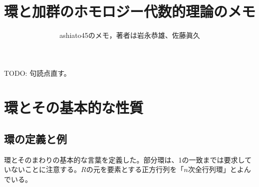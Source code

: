 \documentclass[9pt]{ltjsarticle}
\title{環と加群のホモロジー代数的理論のメモ}
\author{ashiato45のメモ，著者は岩永恭雄、佐藤眞久}
\begin{document}
\maketitle

TODO: 句読点直す。

\section{環とその基本的な性質}
\label{sec:環とその基本的な性質}

\subsection{環の定義と例}
\label{sub:環の定義と例}

環とそのまわりの基本的な言葉を定義した。部分環は、1の一致までは要求していないことに注意する。$R$の元を要素とする正方行列を「$n$次全行列環」とよんでいる。
\end{document}
